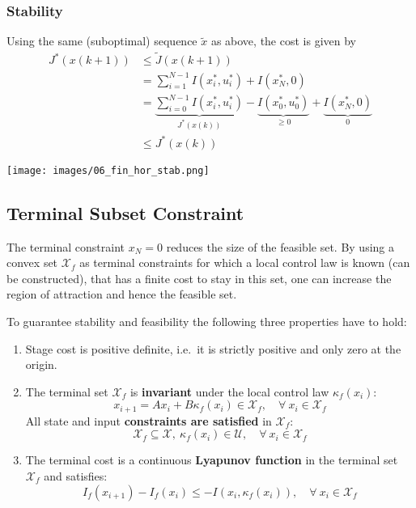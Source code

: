 \subsubsection{Stability}
Using the same (suboptimal) sequence $\widetilde{x}$ as above, the cost is given by
\begin{align*}
    J^*(x(k+1)) & \leq \widetilde{J}(x(k+1))                                                                                                         \\
                & = \sum_{i=1}^{N-1} I(x_i^*, u_i^*) + I(x_N^*, 0)                                                                                   \\
                & =\underbrace{\sum_{i=0}^{N-1} I(x_i^*, u_i^*)}_{J^*(x(k))} - \underbrace{I(x_0^*, u_0^*)}_{\geq 0}  + \underbrace{I(x_N^*, 0)}_{0} \\
                & \leq J^*(x(k))
\end{align*}
\begin{center}
    \texttt{[image: images/06\_fin\_hor\_stab.png]}
\end{center}

\subsection{Terminal Subset Constraint}
The terminal constraint $x_N = 0$ reduces the size of the feasible set. By using a convex set $\mathcal{X}_f$ as terminal constraints for which a local control law is known (can be constructed), that has a finite cost to stay in this set, one can increase the region of attraction and hence the feasible set.

\newpar{}

To guarantee stability and feasibility the following three properties have to hold:
\begin{enumerate}
    \item Stage cost is positive definite, i.e.\ it is strictly positive and only zero at the origin.
    \item The terminal set $\mathcal{X}_f$ is \textbf{invariant} under the local control law $\kappa_f(x_i)$:
          \begin{equation*}
              x_{i+1} = Ax_i +B\kappa_f(x_i) \in \mathcal{X}_f, \quad \forall\: x_i \in \mathcal{X}_f
          \end{equation*}
          All state and input \textbf{constraints are satisfied} in $\mathcal{X}_f$:
          \begin{equation*}
              \mathcal{X}_f \subseteq \mathcal{X}, \: \kappa_f(x_i) \in \mathcal{U}, \quad \forall\: x_i \in \mathcal{X}_f
          \end{equation*}
    \item The terminal cost is a continuous \textbf{Lyapunov function} in the terminal set $\mathcal{X}_f$ and satisfies:
          \begin{equation*}
              I_f(x_{i+1})-I_f(x_i) \leq -I(x_i,\kappa_f(x_i)), \quad \forall\: x_i \in \mathcal{X}_f
          \end{equation*}
\end{enumerate}

